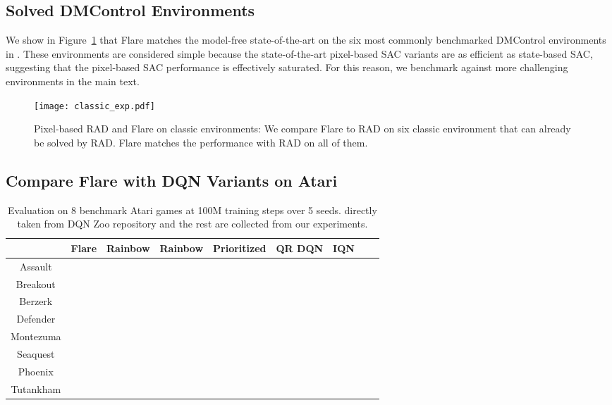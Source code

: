 \documentclass{article} \usepackage{iclr2021_conference,times}
\begin{document}
\subsection{Solved DMControl Environments}
\label{sec:classicenvs}
We show in Figure~\ref{fig:classic} that Flare matches the model-free state-of-the-art on the six most commonly benchmarked DMControl environments in \citet{laskin_lee2020rad, kostrikov2020image, hafner2019dream}. These environments are considered simple because the state-of-the-art pixel-based SAC variants are as efficient as state-based SAC, suggesting that the pixel-based SAC performance is effectively saturated. For this reason, we benchmark against more challenging environments in the main text.
\begin{figure}[h]
\begin{center}
\texttt{[image: classic\_exp.pdf]}
\end{center}
\caption{Pixel-based RAD and Flare on classic environments: We compare Flare to RAD on six classic environment that can already be solved by RAD. Flare matches the performance with RAD on all of them.}\label{fig:classic}
\end{figure}
\fi


\subsection{Compare Flare with DQN Variants on Atari}
\label{sec:atari}
\begin{table}[h]
\centering
\smaller 
\begin{tabular}{c|cccccccc}
 &Flare&Rainbow& Rainbow& Prioritized & QR DQN & IQN \\ \hline
Assault &  &  &   &  &  &   \\
Breakout &  &  &   &  &   &  \\
Berzerk &  &  &   &  &  &   \\
Defender &  &  &   &  &  &   \\ 
Montezuma &  &  &   &   &  & \\
Seaquest &  &  &   &   &  &   \\
Phoenix &  &  &  &   &  &  \\
Tutankham & &  &  &   &   & \\
\end{tabular}
\caption{\small{Evaluation on  8 benchmark  Atari games at 100M training steps over 5 seeds.  directly taken from DQN Zoo repository and the rest are collected from our experiments.  }}\label{tab:atari}
\end{table}
\end{document}
